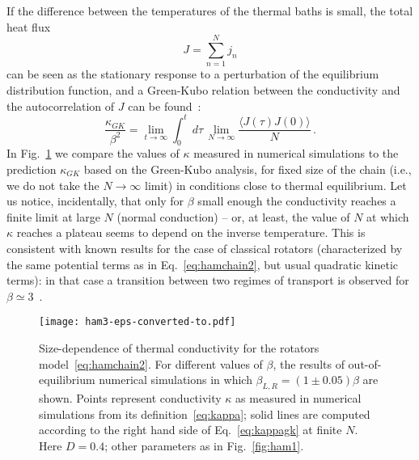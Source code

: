 \documentclass[iop, twocolumns, amssymb,notitlepage]{revtex4-1}
\newcommand{\indice}{n}
\begin{document}
If the difference between the temperatures of the thermal baths is small, the total heat flux
\begin{equation}
\label{eq:totalj}
 J=\sum_{\indice=1}^{N}j_{\indice}
\end{equation} 
can be seen as the stationary response to a perturbation of the equilibrium 
distribution function, and a Green-Kubo relation between the conductivity and 
the autocorrelation of $J$ can be found~\cite{kubo66, lepri03}:
\begin{equation}
\label{eq:kappagk}
  \frac{\kappa_{GK}}{\beta^2} = \lim_{t \to \infty} \int_{0}^{t}\, d\tau\, \lim_{N \to \infty} \frac{\langle J(\tau) J(0)\rangle}{N}\,.
\end{equation} 
In Fig.~\ref{fig:ham3} we compare the values of $\kappa$ measured in numerical 
simulations to the prediction $\kappa_{GK}$ based on the Green-Kubo analysis, 
for fixed size of the chain (i.e., we do not take the $N\to \infty$ limit) in 
conditions close to thermal equilibrium. Let us notice, incidentally, that only 
for $\beta$ small enough the conductivity reaches a finite limit at large $N$ 
(normal conduction) -- or, at least, the value of $N$ at which $\kappa$ reaches 
a plateau seems to depend on the inverse temperature. This is consistent with 
known results for the case of classical rotators (characterized by the same 
potential terms as in Eq.~\eqref{eq:hamchain2}, but usual quadratic kinetic 
terms): in that case a transition between two regimes of transport is 
observed for $\beta \simeq 3$~\cite{gendelman00}.

 \begin{figure}
 \centering
\texttt{[image: ham3-eps-converted-to.pdf]}
\caption{\label{fig:ham3} Size-dependence of thermal conductivity for the rotators model~\eqref{eq:hamchain2}. For different values of $\beta$, the results of out-of-equilibrium numerical simulations in which $\beta_{L,R}=(1 \pm 0.05)\beta$ are shown. Points represent conductivity $\kappa$ as measured in numerical simulations from its definition~\eqref{eq:kappa}; solid lines are computed according to the right hand side of Eq.~\eqref{eq:kappagk} at finite $N$. Here $D=0.4$; other parameters as in Fig.~\ref{fig:ham1}.}
 \end{figure}
 
\end{document}
